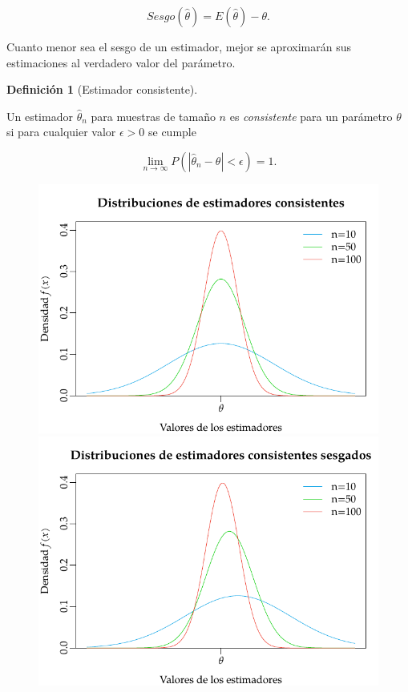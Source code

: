 \documentclass[
  a4paper,
]{scrreport}
\theoremstyle{plain}
\theoremstyle{definition}
\theoremstyle{definition}
\newtheorem{definition}{Definición}[chapter]
\theoremstyle{remark}
\begin{document}
\[
Sesgo(\hat \theta) = E(\hat \theta)-\theta.
\]

Cuanto menor sea el sesgo de un estimador, mejor se aproximarán sus
estimaciones al verdadero valor del parámetro.

\begin{definition}[Estimador
consistente]\protect\hypertarget{def-estimador-consistente}{}\label{def-estimador-consistente}

Un estimador \(\hat \theta_n\) para muestras de tamaño \(n\) es
\emph{consistente} para un parámetro \(\theta\) si para cualquier valor
\(\epsilon>0\) se cumple

\[
\lim_{n\rightarrow \infty} P(|\hat \theta_n-\theta|<\epsilon)=1.
\]

\end{definition}

\begin{figure}

\begin{minipage}{0.50\linewidth}

\includegraphics{img/estimacion/estimadores-consistentes.pdf}

\end{minipage}%
%
\begin{minipage}{0.50\linewidth}

\includegraphics{img/estimacion/estimadores-consistentes-sesgados.pdf}


\end{minipage}
\end{figure}
\end{document}
